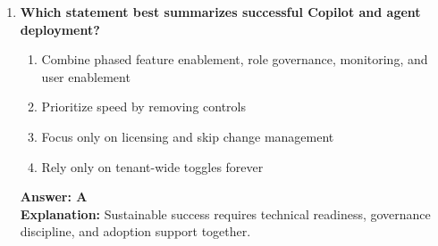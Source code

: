 \documentclass[10pt]{article}
\begin{document}
\begin{enumerate}[leftmargin=*]
\item \textbf{Which statement best summarizes successful Copilot and agent deployment?}
\begin{enumerate}[label=\Alph*.]
  \item Combine phased feature enablement, role governance, monitoring, and user enablement
  \item Prioritize speed by removing controls
  \item Focus only on licensing and skip change management
  \item Rely only on tenant-wide toggles forever
\end{enumerate}
\textbf{Answer: A}\\
\textbf{Explanation:} Sustainable success requires technical readiness, governance discipline, and adoption support together.

\end{enumerate}


\clearpage
\end{document}
